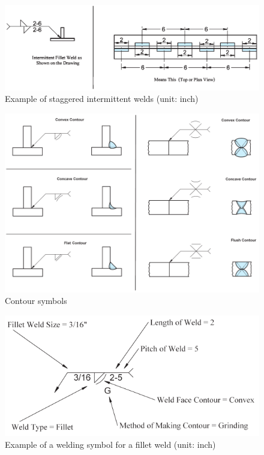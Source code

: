 \begin{figure}[H]
\centering
\includegraphics[width=.99\textwidth]{PIC/CH07/EXAMPLE/IW2}
\caption{Example of staggered intermittent welds (unit: inch) \citep{Corgan2017}}
\end{figure}
\begin{figure}[H]
\centering
\includegraphics[width=.85\textwidth]{PIC/CH07/EXAMPLE/CS}
\caption{Contour symbols \citep{Corgan2017}}
\end{figure}
\begin{figure}[H]
\centering
\includegraphics{PIC/CH07/EXAMPLE/FW}
\caption{Example of a welding symbol for a fillet weld (unit: inch) \citep{Corgan2017}}
\end{figure}
